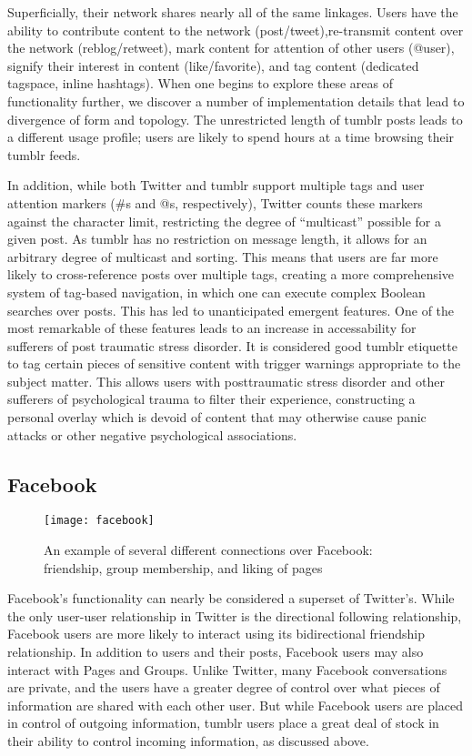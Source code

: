 Superficially, their network shares nearly all of the same linkages.  
Users have the ability to contribute content to the network 
(post/tweet),re-transmit content over the network (reblog/retweet), 
mark content for attention of other users (@user), signify their 
interest in content (like/favorite), and tag content (dedicated 
tagspace, inline hashtags). When one begins to explore these areas of 
functionality further, we discover a number of implementation details 
that lead to divergence of form and topology.  The unrestricted length 
of tumblr posts leads to a different usage profile; users are likely to 
spend hours at a time\cite{duggan2013demographics} browsing their 
tumblr feeds.  


In addition, while both Twitter and tumblr support multiple tags and 
user attention markers (\#s and @s, respectively), Twitter counts these 
markers against the character limit, restricting the degree of 
``multicast'' possible for a given post.  As tumblr has no restriction 
on message length, it allows for an arbitrary degree of multicast and 
sorting.  This means that users are far more likely to cross-reference 
posts over multiple tags, creating a more comprehensive system of tag-based 
navigation, in which one can execute complex Boolean searches over posts.  
This has led to unanticipated emergent features. One of the most 
remarkable of these features leads to an increase in accessability for 
sufferers of post traumatic stress disorder.  It is considered good 
tumblr etiquette to tag certain pieces of sensitive content with trigger 
warnings appropriate to the subject matter.  This allows users with 
posttraumatic stress disorder and other sufferers of psychological 
trauma to filter their experience, constructing a personal overlay 
which is devoid of content that may otherwise cause panic attacks or 
other negative psychological associations.


\subsection{Facebook}
\begin{figure}[bht]
\centering
 \texttt{[image: facebook]}
 \caption{An example of several different connections over Facebook: friendship, group membership, and liking of pages}
 \label{fig:facebook}
\end{figure}
Facebook's functionality can nearly be considered a superset of Twitter's.  
While the 
only user-user relationship in Twitter is the directional following 
relationship, Facebook users are more likely to interact using its 
bidirectional friendship relationship.  In addition to users and their 
posts, Facebook users may also interact with Pages and Groups.  Unlike 
Twitter, many Facebook conversations are private, and the users have a 
greater degree of control over what pieces of information are shared 
with each other user.  But while Facebook users are placed in control of 
outgoing information, tumblr users place a great deal of stock in their 
ability to control incoming information, as discussed above.

